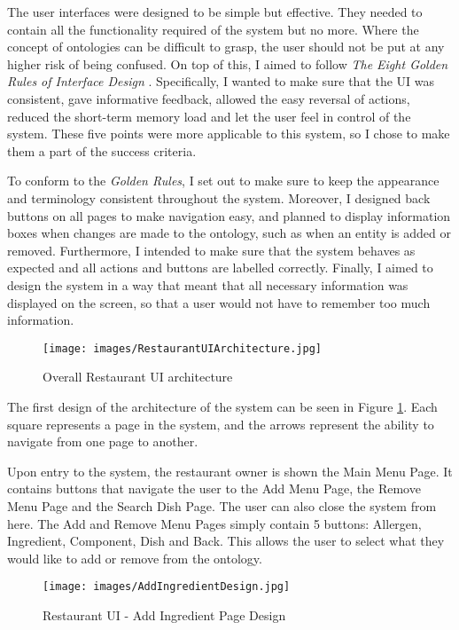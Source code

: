The user interfaces were designed to be simple but effective. They needed to contain all the functionality required of the system but no more. Where the concept of ontologies can be difficult to grasp, the user should not be put at any higher risk of being confused. On top of this, I aimed to follow \textit{The Eight Golden Rules of Interface Design} \cite{shneiderman}. Specifically, I wanted to make sure that the UI was consistent, gave informative feedback, allowed the easy reversal of actions, reduced the short-term memory load and let the user feel in control of the system. These five points were more applicable to this system, so I chose to make them a part of the success criteria.

To conform to the \textit{Golden Rules}, I set out to make sure to keep the appearance and terminology consistent throughout the system. Moreover, I designed back buttons on all pages to make navigation easy, and planned to display information boxes when changes are made to the ontology, such as when an entity is added or removed. Furthermore, I intended to make sure that the system behaves as expected and all actions and buttons are labelled correctly. Finally, I aimed to design the system in a way that meant that all necessary information was displayed on the screen, so that a user would not have to remember too much information.

\begin{figure}[h]
    \centering
    \captionsetup{justification=centering}
    \texttt{[image: images/RestaurantUIArchitecture.jpg]}
    \caption{Overall Restaurant UI architecture}
    \label{fig:restaurantUI_architecture}
\end{figure}

The first design of the architecture of the system can be seen in Figure \ref{fig:restaurantUI_architecture}. Each square represents a page in the system, and the arrows represent the ability to navigate from one page to another.

Upon entry to the system, the restaurant owner is shown the Main Menu Page. It contains buttons that navigate the user to the Add Menu Page, the Remove Menu Page and the Search Dish Page. The user can also close the system from here. The Add and Remove Menu Pages simply contain 5 buttons: Allergen, Ingredient, Component, Dish and Back. This allows the user to select what they would like to add or remove from the ontology.

\begin{figure}[h]
    \centering
    \captionsetup{justification=centering}
    \texttt{[image: images/AddIngredientDesign.jpg]}
    \caption{Restaurant UI - Add Ingredient Page Design}
    \label{fig:restaurantUI_add_page_design}
\end{figure}

